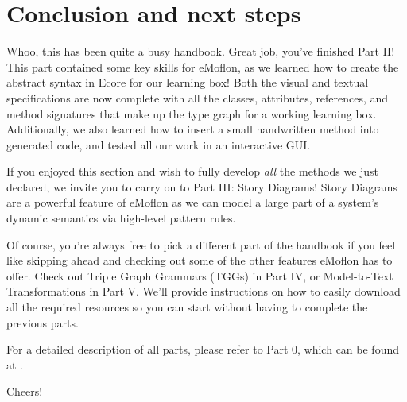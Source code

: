 \newpage
\section{Conclusion and next steps}
\genHeader

\vspace{0.5cm}

Whoo, this has been quite a busy handbook. Great job, you've finished Part II! This part contained some key skills for eMoflon, as we learned how to create
the abstract syntax in Ecore for our learning box! Both the visual and textual specifications are now complete with all the classes, attributes, references, and
method signatures that make up the type graph for a working learning box. Additionally, we also learned how to insert a small handwritten method into generated
code, and tested all our work in an interactive GUI.

If you enjoyed this section and wish to fully develop \emph{all} the methods we just declared, we invite you to carry on to Part III: Story
Diagrams! Story Diagrams are a powerful feature of eMoflon as we can model a large part of a system's dynamic semantics via high-level pattern rules. 


Of course, you're always free to pick a different part of the handbook if you feel like skipping ahead and checking out some of the other features eMoflon has
to offer. Check out Triple Graph Grammars (TGGs)  in Part IV, or Model-to-Text Transformations in Part V. We'll provide instructions on how to easily download
all the required resources so you can start without having to complete the previous parts.

For a detailed description of all parts, please refer to Part 0, which can be found at \dlPartZero.

\vspace{1.0cm}

Cheers!